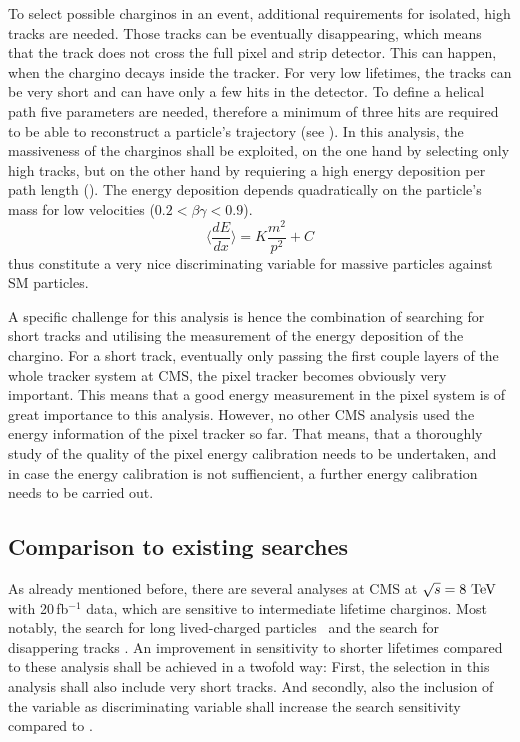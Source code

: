 To select possible charginos in an event, additional requirements for isolated, high \pt tracks are needed.
Those tracks can be eventually disappearing, which means that the track does not cross the full pixel and strip detector.
This can happen, when the chargino decays inside the tracker.
For very low lifetimes, the tracks can be very short and can have only a few hits in the detector. 
To define a helical path five parameters are needed, therefore a minimum of three hits are required to be able to reconstruct a particle's trajectory (see \cite{bib:CMS:tracking_8TeV}).
In this analysis, the massiveness of the charginos shall be exploited, on the one hand by selecting only high \pt tracks, but on the other hand by requiering a high energy deposition per path length (\dedx).
The energy deposition depends quadratically on the particle's mass for low velocities ($0.2<\beta\gamma<0.9$).
\begin{equation}
\langle\frac{dE}{dx}\rangle = K \frac{m^2}{p^2} +C
\end{equation}
thus constitute a very nice discriminating variable for massive particles against SM particles.
 
A specific challenge for this analysis is hence the combination of searching for short tracks and utilising the measurement of the energy deposition of the chargino.
For a short track, eventually only passing the first couple layers of the whole tracker system at CMS, the pixel tracker becomes obviously very important.
This means that a good energy measurement in the pixel system is of great importance to this analysis.
However, no other CMS analysis used the energy information of the pixel tracker so far.
That means, that a thoroughly study of the quality of the pixel energy calibration needs to be undertaken, and in case the energy calibration is not suffiencient, a further energy calibration needs to be carried out.


\subsection{Comparison to existing searches}
As already mentioned before, there are several analyses at CMS at $\sqrt{s}=8\,\,\text{Te}\kern-0.06667em\text{V}$ with 20\,fb$^{-1}$ data, which are sensitive to intermediate lifetime charginos. 
Most notably, the search for long lived-charged \mbox{particles \cite{bib:CMS:HSCP_8TeV}} and the search for disappering tracks \cite{bib:CMS:DT_8TeV}.
An improvement in sensitivity to shorter lifetimes compared to these analysis shall be achieved in a twofold way:
First, the selection in this analysis shall also include very short tracks.
And secondly, also the inclusion of the variable \dedx as discriminating variable shall increase the search sensitivity compared to \cite{bib:CMS:DT_8TeV}.

